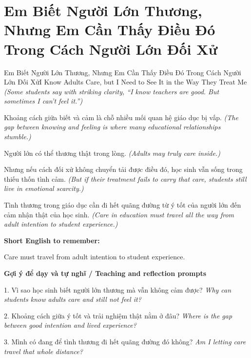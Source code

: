 \section{Em Biết Người Lớn Thương, Nhưng Em Cần Thấy Điều Đó Trong Cách Người Lớn Đối Xử}
\begin{truyen}{Em Biết Người Lớn Thương, Nhưng Em Cần Thấy Điều Đó Trong Cách Người Lớn Đối Xử}{I Know Adults Care, but I Need to See It in the Way They Treat Me}
\textit{(Some students say with striking clarity, “I know teachers are good. But sometimes I can't feel it.”)}

Khoảng cách giữa biết và cảm là chỗ nhiều mối quan hệ giáo dục bị vấp.
\textit{(The gap between knowing and feeling is where many educational relationships stumble.)}

Người lớn có thể thương thật trong lòng.
\textit{(Adults may truly care inside.)}

Nhưng nếu cách đối xử không chuyển tải được điều đó, học sinh vẫn sống trong thiếu thốn tình cảm.
\textit{(But if their treatment fails to carry that care, students still live in emotional scarcity.)}

\end{truyen}

\begin{baihoc}
Tình thương trong giáo dục cần đi hết quãng đường từ ý tốt của người lớn đến cảm nhận thật của học sinh.
\textit{(Care in education must travel all the way from adult intention to student experience.)}
\end{baihoc}

\begin{ghinhoanh}
\textbf{Short English to remember:}

Care must travel from adult intention to student experience.

\end{ghinhoanh}

\begin{tuhocnhanh}
\textbf{Gợi ý để dạy và tự nghĩ / Teaching and reflection prompts}

1. Vì sao học sinh biết người lớn thương mà vẫn không cảm được? \textit{Why can students know adults care and still not feel it?}

2. Khoảng cách giữa ý tốt và trải nghiệm thật nằm ở đâu? \textit{Where is the gap between good intention and lived experience?}

3. Mình có đang để tình thương đi hết quãng đường đó không? \textit{Am I letting care travel that whole distance?}
\end{tuhocnhanh}

